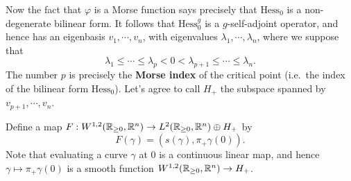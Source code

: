 Now the fact that $\varphi$ is a Morse function says precisely that $\text{Hess}_{0}$ is a non-degenerate bilinear form. It follows that $\text{Hess}^{g}_{0}$ is a $g$-self-adjoint operator, and hence has an eigenbasis $v_{1},\cdots,v_{n}$, with eigenvalues $\lambda_{1},\cdots,\lambda_{n}$, where we suppose that
\begin{equation*}
  \lambda_{1}\le \cdots\le \lambda_{p}<0<\lambda_{p+1}\le \cdots\le \lambda_{n}.
\end{equation*}
The number $p$ is precisely the \textbf{Morse index} of the critical point (i.e.\ the index of the bilinear form $\text{Hess}_{0}$). Let's agree to call $H_{+}$ the subspace spanned by $v_{p+1},\cdots,v_{n}$.

  Define a map $F:W^{1,2}(\mathbb{R}_{\ge 0},\mathbb{R}^{n})\to L^{2}(\mathbb{R}_{\ge 0},\mathbb{R}^{n})\oplus H_{+}$ by
  \begin{equation*}
    F(\gamma)=(s(\gamma),\pi_{+}\gamma(0)).
  \end{equation*}
  Note that evaluating a curve $\gamma$ at $0$ is a continuous linear map, and hence $\gamma\mapsto \pi_{+}\gamma(0)$ is a smooth function $W^{1,2}(\mathbb{R}_{\ge 0},\mathbb{R}^{n})\to H_{+}$.


